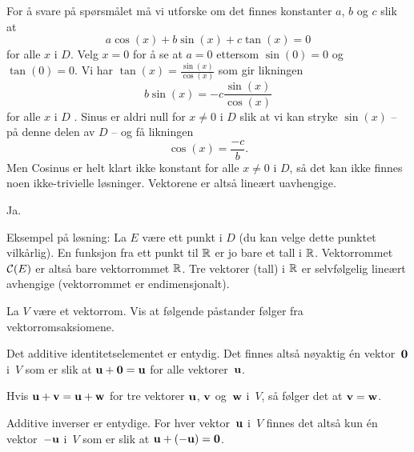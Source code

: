 \begin{losning}
\begin{punkt}
For å svare på spørsmålet må vi utforske om det finnes konstanter $a$, $b$ og $c$ slik at $$a\cos(x)+b\sin(x)+c\tan(x)=0$$ for alle $x$ i $D$. Velg $x=0$ for å se at $a=0$ ettersom $\sin(0)=0$ og $\tan(0)=0$. Vi har $\tan(x)=\frac{\sin(x)}{\cos(x)}$ som gir likningen $$b\sin(x)=-c\frac{\sin(x)}{\cos(x)}$$ for alle $x$ i $D$ . Sinus er aldri null for $x\neq 0$ i $D$ slik at vi kan stryke $\sin(x)$ -- på denne delen av $D$ -- og få likningen $$\cos(x)=\frac{-c}{b}.$$ Men Cosinus er helt klart ikke konstant for alle $x\neq 0$ i $D$, så det kan ikke finnes noen ikke-trivielle løsninger. Vektorene er altså lineært uavhengige.
\end{punkt}

\begin{punkt}
Ja. 

\noindent
Eksempel på løsning: La $E$ være ett punkt i $D$ (du kan velge dette punktet vilkårlig). En funksjon fra ett punkt til $\mathbb{R}$ er jo bare et tall i $\mathbb{R}$. Vektorrommet $\mathcal{C}(E)$ er altså bare vektorrommet $\mathbb{R}$. Tre vektorer (tall) i $\mathbb{R}$ er selvfølgelig lineært avhengige (vektorrommet er endimensjonalt).
\end{punkt}

\end{losning}


\begin{oppgave}
La $V$ være et vektorrom.
Vis at følgende påstander følger fra vektorromsaksiomene.
\begin{punkt}
Det additive identitetselementet er entydig.  Det finnes altså
nøyaktig én vektor~$\mathbf{0}$ i~$V$ som er slik at
$\mathbf{u} + \mathbf{0} = \mathbf{u}$ for alle vektorer~$\mathbf{u}$.
\end{punkt}
\begin{punkt}
Hvis $\mathbf{u} + \mathbf{v} = \mathbf{u} + \mathbf{w}$ for tre vektorer $\mathbf{u}$, $\mathbf{v}$
og~$\mathbf{w}$ i~$V$, så følger det at $\mathbf{v} = \mathbf{w}$.
\end{punkt}
\begin{punkt}
Additive inverser er entydige.  For hver vektor~$\mathbf{u}$ i~$V$ finnes
det altså kun én vektor~$-\mathbf{u}$ i~$V$ som er slik at
$\mathbf{u} + (-\mathbf{u}) = \mathbf{0}$.
\end{punkt}
\end{oppgave}


